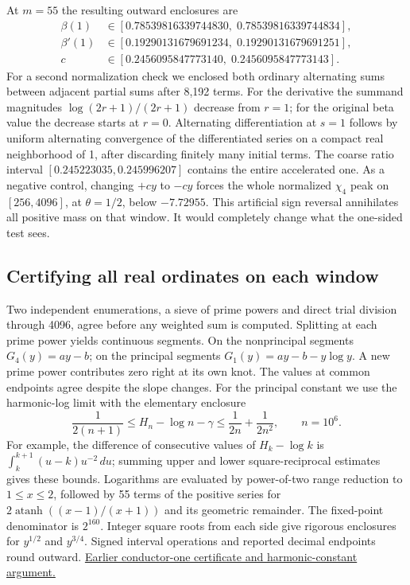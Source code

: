 \documentclass[12pt,letterpaper]{article}
\begin{document}
At \(m=55\) the resulting outward enclosures are
\[
\begin{array}{rl}
\beta(1) &\in[0.78539816339744830,\;0.78539816339744834],\\
\beta'(1)&\in[0.19290131679691234,\;0.19290131679691251],\\
c &\in[0.2456095847773140,\;0.2456095847773143].
\end{array}
\]
For a second normalization check we enclosed both ordinary alternating sums between adjacent partial sums after 8,192 terms. For the derivative the summand magnitudes \(\log(2r+1)/(2r+1)\) decrease from \(r=1\); for the original beta value the decrease starts at \(r=0\). Alternating differentiation at \(s=1\) follows by uniform alternating convergence of the differentiated series on a compact real neighborhood of 1, after discarding finitely many initial terms. The coarse ratio interval \([0.245223035,0.245996207]\) contains the entire accelerated one. As a negative control, changing \(+cy\) to \(-cy\) forces the whole normalized \(\chi_4\) peak on \([256,4096]\), at \(\theta=1/2\), below \(-7.72955\). This artificial sign reversal annihilates all positive mass on that window. It would completely change what the one-sided test sees.

\subsection{Certifying all real ordinates on each window}
Two independent enumerations, a sieve of prime powers and direct trial division through 4096, agree before any weighted sum is computed. Splitting at each prime power yields continuous segments. On the nonprincipal segments \(G_4(y)=ay-b\); on the principal segments \(G_1(y)=ay-b-y\log y\). A new prime power contributes zero right at its own knot. The values at common endpoints agree despite the slope changes. For the principal constant we use the harmonic-log limit with the elementary enclosure
\[
  \frac1{2(n+1)}\le H_n-\log n-\gamma
                  \le\frac1{2n}+\frac1{2n^2},\qquad n=10^6.
\]
For example, the difference of consecutive values of \(H_k-\log k\) is \(\int_k^{k+1}(u-k)u^{-2}\,du\); summing upper and lower square-reciprocal estimates gives these bounds. Logarithms are evaluated by power-of-two range reduction to \(1\le x\le2\), followed by 55 terms of the positive series for \(2\operatorname{atanh}((x-1)/(x+1))\) and its geometric remainder. The fixed-point denominator is \(2^{160}\). Integer square roots from each side give rigorous enclosures for \(y^{1/2}\) and \(y^{3/4}\). Signed interval operations and reported decimal endpoints round outward. \href{https://github.com/nousentllc/riemann-hypothesis/blob/b616d08a805e05e358ad0d2b3cd7b180e058a19e/research/uriel/experiments/second/FINITE_BOUND.md}{Earlier conductor-one certificate and harmonic-constant argument.}
\end{document}
